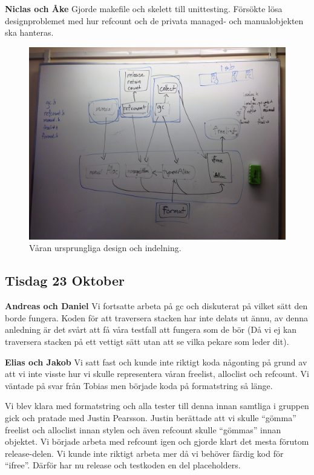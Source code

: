\documentclass{article}
\begin{document}
{\bf Niclas och Åke} Gjorde makefile och skelett till unittesting. Försökte lösa designproblemet med hur refcount och de privata managed- och manualobjekten ska hanteras.


\begin{figure}[H]
  \includegraphics[width=\columnwidth]{../bilder/design_whiteboard.jpg}
  \caption{Våran ursprungliga design och indelning.}
  \label{fig:design}
\end{figure}

\subsection{Tisdag 23 Oktober}

{\bf Andreas och Daniel} Vi fortsatte arbeta på gc och diskuterat på vilket sätt den borde fungera. Koden för att traversera stacken har inte delats ut ännu, av denna anledning är det svårt att få våra testfall att fungera som de bör (Då vi ej kan traversera stacken på ett vettigt sätt utan att se vilka pekare som leder dit).

{\bf Elias och Jakob} Vi satt fast och kunde inte riktigt koda någonting på grund av att vi inte visste hur vi skulle representera våran freelist, alloclist och refcount. Vi väntade på svar från Tobias men började koda på formatstring så länge.

Vi blev klara med formatstring och alla tester till denna innan samtliga i gruppen gick och pratade med Justin Pearsson. Justin berättade att vi skulle “gömma” freelist och alloclist innan stylen och även refcount skulle “gömmas” innan objektet. Vi började arbeta med refcount igen och gjorde klart det mesta förutom release-delen. Vi kunde inte riktigt arbeta mer då vi behöver färdig kod för “ifree”. Därför har nu release och testkoden en del placeholders.
\end{document}
